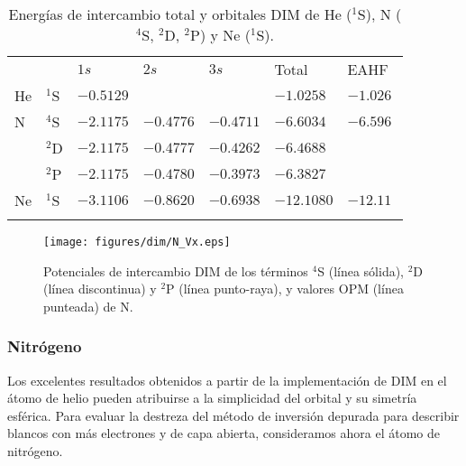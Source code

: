 \begin{table}
\begin{center}
\begin{tabularx}{\textwidth}{
>{\centering\arraybackslash}p{}
>{\centering\arraybackslash}p{}
>{\centering\arraybackslash}p{}
>{\centering\arraybackslash}p{}
>{\centering\arraybackslash}p{}
>{\centering\arraybackslash}p{}
>{\centering\arraybackslash}p{}}
\rowcolor{mydarkgray} 
   &       & $1s$      & $2s$      & $3s$      & Total     & EAHF~\cite{Becke:14} \\
He & $^1$S & $-0.5129$ &           &           & $-1.0258$ & $-1.026$ \\\rowcolor{mygray} 
N  & $^4$S & $-2.1175$ & $-0.4776$ & $-0.4711$ & $-6.6034$ & $-6.596$ \\
   & $^2$D & $-2.1175$ & $-0.4777$ & $-0.4262$ & $-6.4688$ & \\\rowcolor{mygray} 
   & $^2$P & $-2.1175$ & $-0.4780$ & $-0.3973$ & $-6.3827$ & \\
Ne & $^1$S & $-3.1106$ & $-0.8620$ & $-0.6938$ & $-12.1080$ & $-12.11$ \\\rowcolor{mygray} 
\end{tabularx}
\caption[Energías de intercambio total y orbitales de He, N y Ne.]
{Energías de intercambio total y orbitales DIM de He ($^1$S), N ($^4$S, 
$^2$D, $^2$P) y Ne ($^1$S).}
\label{tab:results-atoms}
\end{center}
\end{table}


\begin{figure}[t]
\centering
\texttt{[image: figures/dim/N\_Vx.eps]}
\caption[Potenciales de intercambio DIM de N.]
{Potenciales de intercambio DIM de los términos $^4$S (línea sólida), 
$^2$D (línea discontinua) y $^2$P (línea punto-raya), y valores OPM 
(línea punteada) de N.}
\label{fig:NVx}
\end{figure}


\subsubsection*{Nitrógeno}

Los excelentes resultados obtenidos a partir de la implementación de DIM 
en el átomo de helio pueden atribuirse a la simplicidad del orbital y su 
simetría esférica. Para evaluar la destreza del método de inversión 
depurada para describir blancos con más electrones y de capa abierta, 
consideramos ahora el átomo de nitrógeno. 

